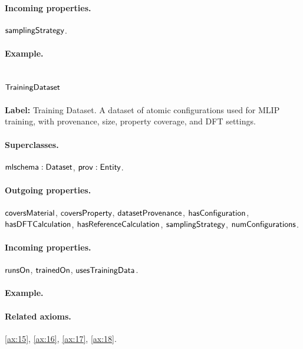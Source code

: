 \paragraph{Incoming properties.} $\mathsf{samplingStrategy}$.

\paragraph{Example.}

\subsection{$\mathsf{TrainingDataset}$}
\label{sec:term-TrainingDataset}

\textbf{Label:} Training Dataset.
A dataset of atomic configurations used for MLIP training, with provenance, size, property coverage, and DFT settings.

\paragraph{Superclasses.} $\mathsf{mlschema:Dataset}$, $\mathsf{prov:Entity}$.

\paragraph{Outgoing properties.} $\mathsf{coversMaterial}$, $\mathsf{coversProperty}$, $\mathsf{datasetProvenance}$, $\mathsf{hasConfiguration}$, $\mathsf{hasDFTCalculation}$, $\mathsf{hasReferenceCalculation}$, $\mathsf{samplingStrategy}$, $\mathsf{numConfigurations}$.

\paragraph{Incoming properties.} $\mathsf{runsOn}$, $\mathsf{trainedOn}$, $\mathsf{usesTrainingData}$.

\paragraph{Example.}

\paragraph{Related axioms.} \eqref{ax:15}, \eqref{ax:16}, \eqref{ax:17}, \eqref{ax:18}.

